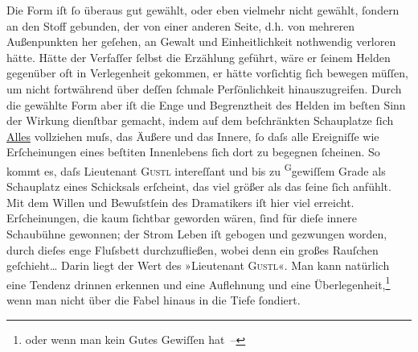 \pstart
           Die Form iſt{ }ſo überaus gut gewählt, oder eben vielmehr nicht gewählt,{ }ſondern an den
               Stoff gebunden, der von einer anderen Seite, d.h. von mehreren Außenpunkten her
               geſehen, an Gewalt und Einheitlichkeit nothwendig verloren hätte. Hätte der Verfaſſer{ }ſelbst die Erzählung geführt,
               wäre er{ }ſeinem Helden gegenüber oft in Verlegenheit gekommen, er hätte vorſichtig{ }ſich bewegen müſſen, um nicht fortwährend über deſſen{ }ſchmale Perſönlichkeit
               hinauszugreifen. Durch die gewählte Form aber iſt die Enge und Begrenztheit des
               Helden im beſten Sinn der Wirkung dienſtbar gemacht, indem auf dem beſchränkten
                  Schau{\pb}platze{ }ſich \uline{Alles} vollziehen muſs, das Äußere und das Innere,{ }ſo
               daſs alle Ereigniſſe wie Erſcheinungen eines beſti{\geminationm}ten
               Innenlebens{ }ſich dort zu begegnen{ }ſcheinen. So kommt es, daſs Lieutenant \textsc{Gustl} intereſſant und bis zu \substVorne{}\textsuperscript{G}\substDazwischen{}g\substHinten{}ewiſſem Grade als Schauplatz eines Schicksals erſcheint, das viel größer als
               das{ }ſeine{ }ſich anfühlt. Mit dem Willen und Bewuſstſein des Dramatikers iſt hier viel
               erreicht. Erſcheinungen, die kaum{ }ſichtbar geworden wären,{ }ſind für dieſe innere
               Schaubühne gewonnen; der Strom Leben iſt gebogen und gezwungen worden, durch dieſes
               enge Fluſsbett durchzufließen, wobei denn ein großes Rauſchen geſchieht{\dots} Darin liegt der Wert des »Lieutenant \textsc{Gustl}«. Man kann natürlich eine Tendenz drinnen erkennen und eine Auflehnung und eine
                  Überlegenheit,\footnote{\noindent{}oder wenn man kein Gutes Gewiſſen hat –} wenn man nicht über die Fabel hinaus in die Tiefe{ }ſondiert.\pend
           
